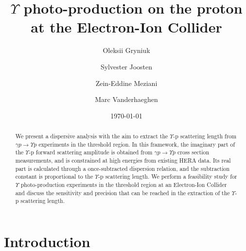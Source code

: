 \documentclass[prd,amsmath,%
twocolumn,floatfix,amssymb, preprintnumbers, linenumbers,nofootinbib, superscriptaddress]{revtex4}
\begin{document}
\title{$\Upsilon$ photo-production on the proton at the Electron-Ion Collider}
\author{Oleksii Gryniuk}
\author{Sylvester Joosten}
\author{Zein-Eddine Meziani}
\author{Marc Vanderhaeghen}
\noaffiliation
\date{\today}

\begin{abstract}

We present a dispersive analysis with the aim to extract the $\Upsilon$-p scattering length from $\gamma p \to \Upsilon p$ experiments in the threshold region. In this framework, the imaginary part of the $\Upsilon$-p forward scattering amplitude is obtained from $\gamma p \to \Upsilon p$ cross section measurements, and is constrained at high energies from existing HERA data. Its real part is calculated through a once-subtracted dispersion relation, and    
the subtraction constant is proportional to the $\Upsilon$-p scattering length. We perform a feasibility study for $\Upsilon$ photo-production experiments in the threshold region at an Electron-Ion Collider and discuss the sensitivity and precision that can be reached in the extraction of the $\Upsilon$-p scattering length. 

\end{abstract}

\maketitle



\section{Introduction}
\end{document}

